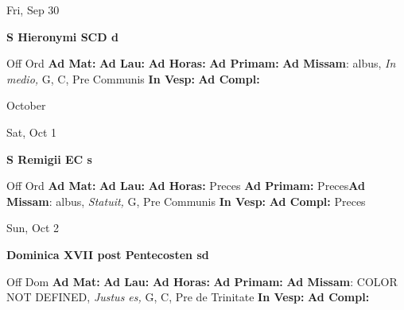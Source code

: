 \documentclass[10pt]{memoir}
\begin{document}
\begin{center}
\begin{minipage}{3.5in}
\vspace{2em}
\begin{center}Fri, Sep 30
\end{center}
\textbf{ \large S Hieronymi SCD
\textnormal{\normalsize d}}

\begin{justify}Off Ord
\textbf{Ad Mat: }
\textbf{Ad Lau: }
\textbf{Ad Horas: }
\textbf{Ad Primam: }\textbf{Ad Missam}: albus, \textit{In medio,} G, C, Pre Communis
\textbf{In Vesp: }
\textbf{Ad Compl: }
\end{justify}
\end{minipage}
\end{center}

\begin{center}
\pagebreak
\thispagestyle{empty}
{\Huge October}
\end{center}
                    
\begin{center}
\begin{minipage}{3.5in}
\vspace{2em}
\begin{center}Sat, Oct 1
\end{center}
\textbf{ \large S Remigii EC
\textnormal{\normalsize s}}

\begin{justify}Off Ord
\textbf{Ad Mat: }
\textbf{Ad Lau: }
\textbf{Ad Horas: }Preces
\textbf{Ad Primam: }Preces\textbf{Ad Missam}: albus, \textit{Statuit,} G, Pre Communis
\textbf{In Vesp: }
\textbf{Ad Compl: }Preces
\end{justify}
\end{minipage}
\end{center}

\begin{center}
\begin{minipage}{3.5in}
\vspace{2em}
\begin{center}Sun, Oct 2
\end{center}
\textbf{ \large Dominica XVII post Pentecosten
\textnormal{\normalsize sd}}

\begin{justify}Off Dom
\textbf{Ad Mat: }
\textbf{Ad Lau: }
\textbf{Ad Horas: }
\textbf{Ad Primam: }\textbf{Ad Missam}: COLOR NOT DEFINED, \textit{Justus es,} G, C, Pre de Trinitate
\textbf{In Vesp: }
\textbf{Ad Compl: }
\end{justify}
\end{minipage}
\end{center}
\end{document}
